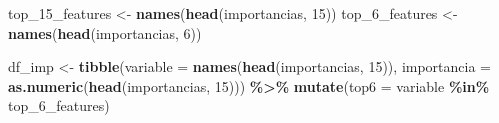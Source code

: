 \documentclass[
]{book}
\newenvironment{Shaded}{\begin{snugshade}}{\end{snugshade}}
\newcommand{\AttributeTok}[1]{\textcolor[rgb]{0.13,0.29,0.53}{#1}}
\newcommand{\DecValTok}[1]{\textcolor[rgb]{0.00,0.00,0.81}{#1}}
\newcommand{\FunctionTok}[1]{\textcolor[rgb]{0.13,0.29,0.53}{\textbf{#1}}}
\newcommand{\NormalTok}[1]{#1}
\newcommand{\OtherTok}[1]{\textcolor[rgb]{0.56,0.35,0.01}{#1}}
\newcommand{\SpecialCharTok}[1]{\textcolor[rgb]{0.81,0.36,0.00}{\textbf{#1}}}
\begin{document}
\begin{Shaded}
\begin{Highlighting}[]
\NormalTok{top\_15\_features }\OtherTok{\textless{}{-}} \FunctionTok{names}\NormalTok{(}\FunctionTok{head}\NormalTok{(importancias, }\DecValTok{15}\NormalTok{))}
\NormalTok{top\_6\_features  }\OtherTok{\textless{}{-}} \FunctionTok{names}\NormalTok{(}\FunctionTok{head}\NormalTok{(importancias, }\DecValTok{6}\NormalTok{))}

\NormalTok{df\_imp }\OtherTok{\textless{}{-}} \FunctionTok{tibble}\NormalTok{(}\AttributeTok{variable =} \FunctionTok{names}\NormalTok{(}\FunctionTok{head}\NormalTok{(importancias, }\DecValTok{15}\NormalTok{)),}
                  \AttributeTok{importancia =} \FunctionTok{as.numeric}\NormalTok{(}\FunctionTok{head}\NormalTok{(importancias, }\DecValTok{15}\NormalTok{))) }\SpecialCharTok{\%\textgreater{}\%}
  \FunctionTok{mutate}\NormalTok{(}\AttributeTok{top6 =}\NormalTok{ variable }\SpecialCharTok{\%in\%}\NormalTok{ top\_6\_features)}


\end{Highlighting}
\end{Shaded}
\end{document}
